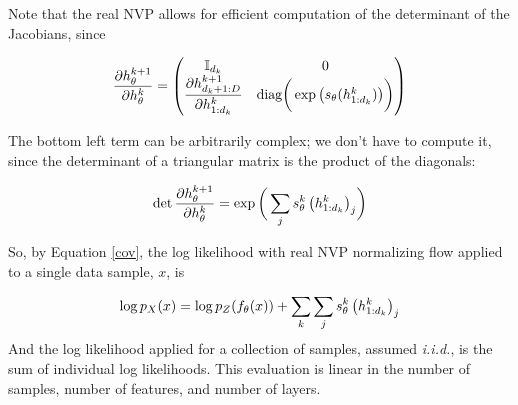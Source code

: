 \documentclass[10pt]{beamer}
\newcommand{\I}{\mathbb{I}}
\begin{document}
\begin{frame}
Note that the real NVP allows for efficient computation of the determinant of the Jacobians, since 

\[ \df{\partial h_\theta^{k+1}}{\partial h_\theta^{k}} = 
	\begin{pmatrix}
	\I_{d_k} & 0\\ 
	\df{\partial h_{d_k+1:D}^{k+1}}{\partial h_{1:d_k}^{k}} & \text{diag} \bigg( \exp \big( s_\theta (h^k_{1:d_k}) \big) \bigg) 
	\end{pmatrix}
\]

The bottom left term can be arbitrarily complex; we don't have to compute it, since the determinant of a triangular matrix is the product of the diagonals:

\[ \det \displaystyle\frac{\partial h_\theta^{k+1}}{\partial h_\theta^{k}} = \exp \bigg( \displaystyle\sum_j s_\theta^k \, \big( h^k_{1:d_k} \big)_j \bigg) \] 
\end{frame}

%

\begin{frame}
So, by Equation \ref{cov}, the log likelihood with real NVP normalizing flow applied to a single data sample, $x$, is

\[ \log p_X(x) = \log p_Z( f_\theta(x) ) + \displaystyle\sum_k \displaystyle\sum_j s_\theta^k \, \big( h^k_{1:d_k} \big)_j \] 
\pause 
\vfill
And the log likelihood applied for a collection of samples, assumed \textit{i.i.d.}, is the sum of individual log likelihoods. 
\pause
\vfill
This evaluation is linear in the number of samples, number of features, and number of layers.
\end{frame}
 
\end{document}
